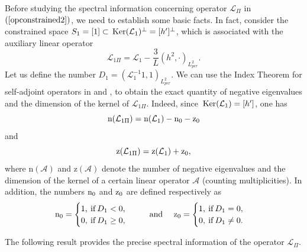 \documentclass[12pt,reqno,a4paper]{amsart} %
\newcommand{\Ker}{{\rm \,Ker}}
\numberwithin{equation}{section}
\numberwithin{figure}{section}
\begin{document}
 \indent Before studying the spectral information concerning operator $\mathcal{L}_{\Pi}$ in $(\ref{opconstrained2})$, we need to establish some basic facts. In fact, consider the constrained space $S_1= [1] \subset \Ker(\mathcal{L}_1)^{\perp}=[h']^{\bot}$, which is associated with the auxiliary linear operator $$\mathcal{L}_{1\Pi}=\mathcal{L}_1-\frac{3}{L}(h^2,\cdot)_{L_{per}^2}.$$ Let us define the number
 $
 D_1=(\mathcal{L}_1^{-1} 1,1)_{L^2_{per}}.
 $
 We can use the Index Theorem for self-adjoint operators in \cite[Theorem 5.3.2]{kapitula} and \cite[Theorem 4.1]{pel-book}, to obtain the exact quantity of negative eigenvalues and the dimension of the kernel of $\mathcal{L}_{1\Pi}$. Indeed, since $\Ker(\mathcal{L}_1)=[h']$, one has 
 \begin{equation}\label{indexformula12}
 	\text{n}(\mathcal{L}_{{1\Pi}})=\text{n}(\mathcal{L}_1)-{\rm n}_0-{\rm z}_0
 \end{equation}
 and
 \begin{equation}\label{indexformula123}
 	\text{z}(\mathcal{L}_{{1\Pi}})=\text{z}(\mathcal{L}_1)+{\rm z}_0,
 \end{equation}
 where $\text{n}(\mathcal{A})$ and $\text{z}(\mathcal{A})$ denote the number of negative eigenvalues and the dimension of the kernel of a certain linear operator $\mathcal{A}$ (counting multiplicities). In addition, the numbers ${\rm n}_0$ and ${\rm z}_0$ are defined respectively as
 \begin{equation}\label{n0z0}
 	{\rm n}_0=
 	\begin{cases}
 		1, \: \text{if} \: D_1<0, \\
 		0, \: \text{if} \: D_1 \geq 0,\ \
 	\end{cases}
 	\quad \text{and} \quad\ 
 	{\rm z}_0=
 	\begin{cases}
 		1, \: \text{if} \: D_1=0, \\
 		0, \: \text{if} \: D_1 \neq 0.
 	\end{cases}
 \end{equation}
 
\indent The following result provides the precise spectral information of the operator $\mathcal{L}_{\Pi}$.%
\end{document}
